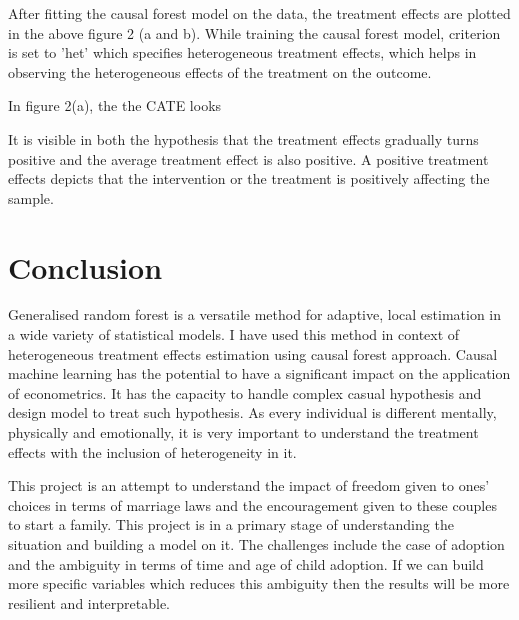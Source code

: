 \documentclass[11pt, a4paper, leqno]{article}
\begin{document}
After fitting the causal forest model on the data, the treatment effects are plotted in the above figure 2 (a and b). While training the causal 
forest model, criterion is set to 'het' which specifies heterogeneous treatment effects, which helps in observing the heterogeneous effects of the 
treatment on the outcome.

In figure 2(a), the the CATE looks 

It is visible in both the hypothesis that the treatment effects gradually turns positive and the average treatment effect is also positive. A 
positive treatment effects depicts that the intervention or the treatment is positively affecting the sample.

\section{Conclusion} %
\label{sec:Conclusion}

Generalised random forest is a versatile method for adaptive, local estimation in a wide variety of statistical models. I have used this method 
in context of heterogeneous treatment effects estimation using causal forest approach. Causal machine learning has the potential to have a 
significant impact on the application of econometrics. It has the capacity to handle complex casual hypothesis and design model to treat such 
hypothesis. As every individual is different mentally, physically and emotionally, it is very important to understand the treatment effects with 
the inclusion of heterogeneity in it.

This project is an attempt to understand the impact of freedom given to ones' choices in terms of marriage laws and the encouragement given to 
these couples to start a family. This project is in a primary stage of understanding the situation and building a model on it. The challenges 
include the case of adoption and the ambiguity in terms of time and age of child adoption. If we can build more specific variables which reduces 
this ambiguity then the results will be more resilient and interpretable.




\printbibliography
{}



\end{document}
